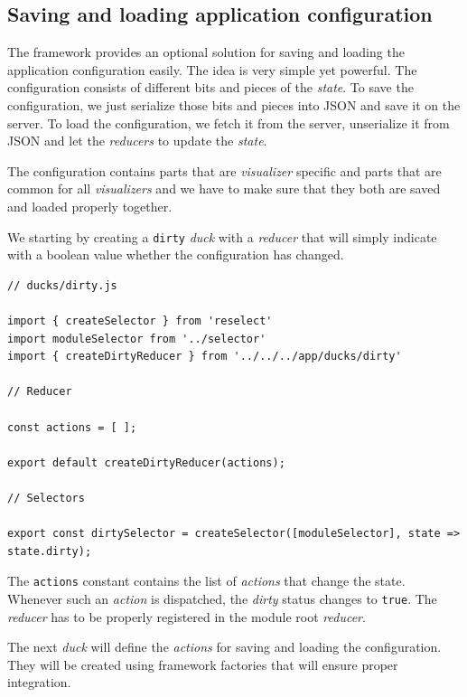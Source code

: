 \subsection{Saving and loading application configuration}
\label{sec:implementation:integrating-visualizer:configuration}

The framework provides an optional solution for saving and loading the application configuration easily. The idea is very simple yet powerful. The configuration consists of different bits and pieces of the \emph{state}. To save the configuration, we just serialize those bits and pieces into JSON and save it on the server. To load the configuration, we fetch it from the server, unserialize it from JSON and let the \emph{reducers} to update the \emph{state}.

The configuration contains parts that are \emph{visualizer} specific and parts that are common for all \emph{visualizers} and we have to make sure that they both are saved and loaded properly together.

We starting by creating a \texttt{dirty} \emph{duck} with a \emph{reducer} that will simply indicate with a boolean value whether the configuration has changed.

\begin{verbatim}
// ducks/dirty.js

import { createSelector } from 'reselect'
import moduleSelector from '../selector'
import { createDirtyReducer } from '../../../app/ducks/dirty'

// Reducer

const actions = [ ];

export default createDirtyReducer(actions);

// Selectors

export const dirtySelector = createSelector([moduleSelector], state => state.dirty);
\end{verbatim}

The \texttt{actions} constant contains the list of \emph{actions} that change the state. Whenever such an \emph{action} is dispatched, the \emph{dirty} status changes to \texttt{true}. The \emph{reducer} has to be properly registered in the module root \emph{reducer}.

The next \emph{duck} will define the \emph{actions} for saving and loading the configuration. They will be created using framework factories that will ensure proper integration.

